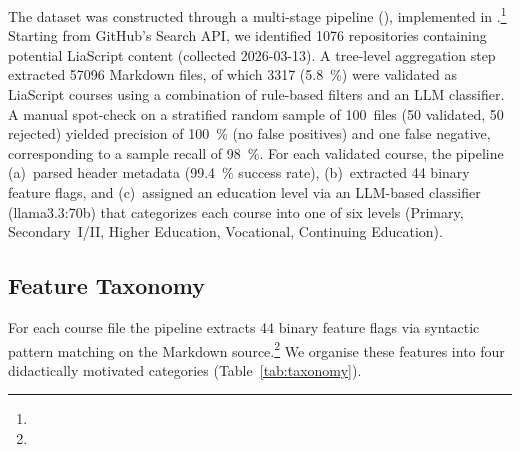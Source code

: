 The dataset was constructed through a multi-stage pipeline
(), implemented in .\footnote{}
Starting from GitHub's Search API, we identified \num{1076} repositories
containing potential LiaScript content (collected 2026-03-13).
A tree-level aggregation step extracted \num{57096} Markdown files,
of which \num{3317} (\SI{5.8}{\percent}) were validated as LiaScript courses
using a combination of rule-based filters and an LLM classifier.
A manual spot-check on a stratified random sample of \num{100}~files
(50 validated, 50 rejected) yielded precision of \SI{100}{\percent}
(no false positives) and one false negative, corresponding to a
sample recall of \SI{98}{\percent}.
For each validated course, the pipeline (a)~parsed header metadata
(\SI{99.4}{\percent} success rate), (b)~extracted \num{44} binary
feature flags, and (c)~assigned an education level via an LLM-based
classifier (llama3.3:70b) that categorizes each course into one of
six levels (Primary, Secondary~I/II, Higher Education, Vocational,
Continuing Education).

\subsection{Feature Taxonomy}
\label{sec:taxonomy}

For each course file the pipeline extracts \num{44} binary feature flags
via syntactic pattern matching on the Markdown source.\footnote{}
We organise these features into four didactically motivated categories
(Table~\ref{tab:taxonomy}).

